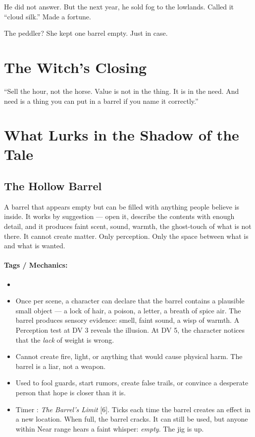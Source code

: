 He did not answer. But the next year, he sold fog to the lowlands. Called it ``cloud silk.'' Made a fortune.

The peddler? She kept one barrel empty. Just in case.

\section*{The Witch's Closing}
``Sell the hour, not the horse. Value is not in the thing. It is in the need. And need is a thing you can put in a barrel if you name it correctly.''

\section*{What Lurks in the Shadow of the Tale}

\subsection*{The Hollow Barrel}

A barrel that appears empty but can be filled with anything people believe is inside. It works by suggestion --- open it, describe the contents with enough detail, and it produces faint scent, sound, warmth, the ghost-touch of what is not there. It cannot create matter. Only perception. Only the space between what is and what is wanted.

\paragraph{Tags / Mechanics:}
\begin{itemize}
\item [ILLUSION] [TRICK] [VEIL]
\item Once per scene, a character can declare that the barrel contains a plausible small object --- a lock of hair, a poison, a letter, a breath of spice air. The barrel produces sensory evidence: smell, faint sound, a wisp of warmth. A Perception test at DV 3 reveals the illusion. At DV 5, the character notices that the \textit{lack} of weight is wrong.
\item Cannot create fire, light, or anything that would cause physical harm. The barrel is a liar, not a weapon.
\item Used to fool guards, start rumors, create false trails, or convince a desperate person that hope is closer than it is.
\item Timer : \textit{The Barrel's Limit} [6]. Ticks each time the barrel creates an effect in a new location. When full, the barrel cracks. It can still be used, but anyone within Near range hears a faint whisper: \textit{empty}. The jig is up.
\end{itemize}

